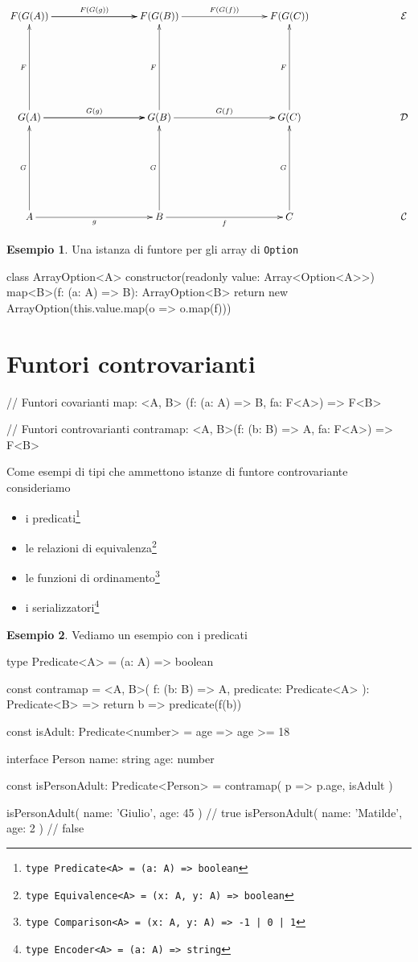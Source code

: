 \documentclass[12pt]{article}
\theoremstyle{definition}
\newtheorem{example}{Esempio}[section]
\newenvironment{code}
  {\vspace{0.5cm} \VerbatimEnvironment\begin{typescriptcode}}
  {\end{typescriptcode} \vspace{0.2cm}}
\begin{document}
\[
\xymatrixrowsep{3cm}
\xymatrixcolsep{3cm}
\xymatrix{
  F(G(A)) \ar[r]^{F(G(g))} \ar[r] & F(G(B)) \ar[r]^{F(G(f))} & F(G(C)) & \mathcal{E} \\
  G(A) \ar[u]^F \ar[r]^{G(g)} \ar[r] & G(B) \ar[u]^F \ar[r]^{G(f)} & G(C) \ar[u]^F & \mathcal{D} \\
  A \ar[u]^G \ar[r]_g & B \ar[u]^G \ar[r]_f & C \ar[u]^G & \mathcal{C}
}
\]

\begin{example}
Una istanza di funtore per gli array di \texttt{Option}

\begin{code}
class ArrayOption<A> {
  constructor(readonly value: Array<Option<A>>) {}
  map<B>(f: (a: A) => B): ArrayOption<B> {
    return new ArrayOption(this.value.map(o => o.map(f)))
  }
}
\end{code}
\end{example}

\newpage

\section{Funtori controvarianti}

\begin{code}
// Funtori covarianti
map: <A, B>      (f: (a: A) => B, fa: F<A>) => F<B>

// Funtori controvarianti
contramap: <A, B>(f: (b: B) => A, fa: F<A>) => F<B>
\end{code}

Come esempi di tipi che ammettono istanze di funtore controvariante consideriamo

\begin{itemize}
  \item i predicati\footnote{\texttt{type Predicate<A> = (a: A) => boolean}}
  \item le relazioni di equivalenza\footnote{\texttt{type Equivalence<A> = (x: A, y: A) => boolean}}
  \item le funzioni di ordinamento\footnote{\texttt{type Comparison<A> = (x: A, y: A) => -1 | 0 | 1}}
  \item i serializzatori\footnote{\texttt{type Encoder<A> = (a: A) => string}}
\end{itemize}

\begin{example}
Vediamo un esempio con i predicati

\begin{code}
type Predicate<A> = (a: A) => boolean

const contramap = <A, B>(
  f: (b: B) => A,
  predicate: Predicate<A>
): Predicate<B> => {
  return b => predicate(f(b))
}

const isAdult: Predicate<number> = age => age >= 18

interface Person {
  name: string
  age: number
}

const isPersonAdult: Predicate<Person> = contramap(
  p => p.age,
  isAdult
)

isPersonAdult({ name: 'Giulio', age: 45 }) // true
isPersonAdult({ name: 'Matilde', age: 2 }) // false
\end{code}
\end{example}
\end{document}
